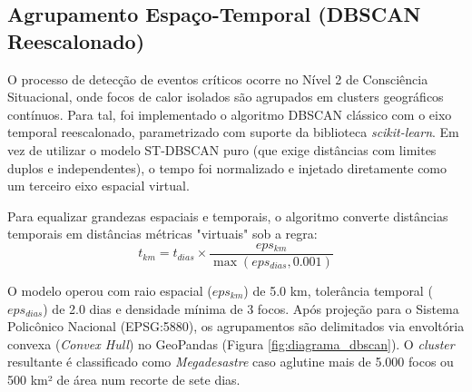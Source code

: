 \subsection{Agrupamento Espaço-Temporal (DBSCAN Reescalonado)}

O processo de detecção de eventos críticos ocorre no Nível 2 de Consciência Situacional, onde focos de calor isolados são agrupados em clusters geográficos contínuos. Para tal, foi implementado o algoritmo DBSCAN clássico com o eixo temporal reescalonado, parametrizado com suporte da biblioteca \textit{scikit-learn}. Em vez de utilizar o modelo ST-DBSCAN puro (que exige distâncias com limites duplos e independentes), o tempo foi normalizado e injetado diretamente como um terceiro eixo espacial virtual. 

Para equalizar grandezas espaciais e temporais, o algoritmo converte distâncias temporais em distâncias métricas "virtuais" sob a regra:
\begin{equation}
t_{km} = t_{dias} \times \frac{eps_{km}}{\max(eps_{dias}, 0.001)}
\end{equation}

O modelo operou com raio espacial ($eps_{km}$) de 5.0 km, tolerância temporal ($eps_{dias}$) de 2.0 dias e densidade mínima de 3 focos. Após projeção para o Sistema Policônico Nacional (EPSG:5880), os agrupamentos são delimitados via envoltória convexa (\textit{Convex Hull}) no GeoPandas (Figura \ref{fig:diagrama_dbscan}). O \textit{cluster} resultante é classificado como \textit{Megadesastre} caso aglutine mais de 5.000 focos ou 500 km² de área num recorte de sete dias.


